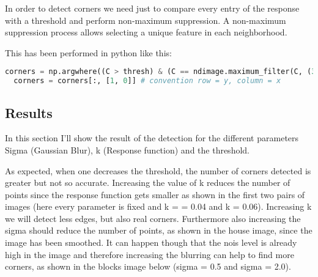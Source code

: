 \documentclass{ETHExercise}
\begin{document}
In order to detect corners we need just to compare every entry of
the response with a threshold and perform non-maximum suppression.
A non-maximum suppression process allows selecting a unique feature in each neighborhood.

This has been performed in python like this:

\begin{lstlisting}[language=Python, caption=corners]
  corners = np.argwhere((C > thresh) & (C == ndimage.maximum_filter(C, (3,3))))
  corners = corners[:, [1, 0]] # convention row = y, column = x
\end{lstlisting}


\subsection{Results}
In this section I'll show the result of the detection for the different parameters Sigma (Gaussian Blur),
k (Response function) and the threshold.

As expected, when one decreases the threshold, the number of corners detected is greater but not so accurate.
Increasing the value of k reduces the number of points since the response function gets smaller as shown in the first two pairs of 
images (here every parameter is fixed and k = = 0.04 and k = 0.06). Increasing k we will
detect less edges, but also real corners. 
Furthermore also increasing the sigma should reduce the number of points, as shown in the house image,
since the image has been smoothed. It can happen though that the nois level is already high in the image and therefore increasing the
blurring can help to find more corners, as shown in the blocks image below (sigma = 0.5 and sigma = 2.0). 
\end{document}
